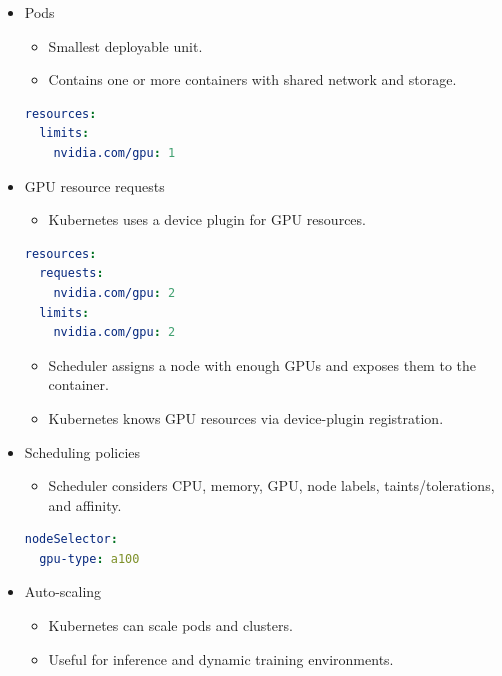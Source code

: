 \documentclass[12pt]{article}
\begin{document}
\begin{itemize}
\item Pods
\begin{itemize}
\item Smallest deployable unit.
\item Contains one or more containers with shared network and storage.
\end{itemize}
\begin{lstlisting}[language=yaml, caption={Pod GPU limit sketch from notes}]
resources:
  limits:
    nvidia.com/gpu: 1
\end{lstlisting}

\item GPU resource requests
\begin{itemize}
\item Kubernetes uses a device plugin for GPU resources.
\end{itemize}
\begin{lstlisting}[language=yaml, caption={Kubernetes GPU request/limit sketch from notes}]
resources:
  requests:
    nvidia.com/gpu: 2
  limits:
    nvidia.com/gpu: 2
\end{lstlisting}
\begin{itemize}
\item Scheduler assigns a node with enough GPUs and exposes them to the container.
\item Kubernetes knows GPU resources via device-plugin registration.
\end{itemize}

\item Scheduling policies
\begin{itemize}
\item Scheduler considers CPU, memory, GPU, node labels, taints/tolerations, and affinity.
\end{itemize}
\begin{lstlisting}[language=yaml, caption={Node selector sketch from notes}]
nodeSelector:
  gpu-type: a100
\end{lstlisting}

\item Auto-scaling
\begin{itemize}
\item Kubernetes can scale pods and clusters.
\item Useful for inference and dynamic training environments.
\end{itemize}
\end{itemize}
\end{document}
